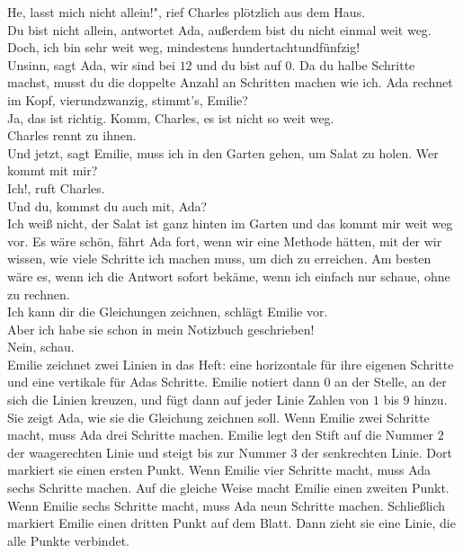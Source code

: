 \frqq{}He, lasst mich nicht allein!", rief Charles plötzlich aus dem Haus.\flqq{}\\
\frqq{}Du bist nicht allein\flqq{}, antwortet Ada, \frqq{} außerdem bist du nicht einmal weit weg.\flqq{}\\
\frqq{}Doch, ich bin sehr weit weg, mindestens hundertachtundfünfzig!\flqq{}\\
\frqq{}Unsinn\flqq{}, sagt Ada, \frqq{}wir sind bei $12$ und du bist auf $0$. Da du halbe Schritte machst, musst du die doppelte Anzahl an Schritten machen wie ich. Ada rechnet im Kopf, vierundzwanzig, stimmt's, Emilie?\flqq{}\\
\frqq{}Ja, das ist richtig. Komm, Charles, es ist nicht so weit weg.\flqq{}\\
Charles rennt zu ihnen.\\ 
\frqq{}Und jetzt\flqq{}, sagt Emilie, \frqq{}muss ich in den Garten gehen, um Salat zu holen. Wer kommt mit mir?\flqq{}\\
\frqq{}Ich!\flqq{}, ruft Charles.\\
\frqq{}Und du, kommst du auch mit, Ada?\flqq{}\\
\frqq{}Ich weiß nicht, der Salat ist ganz hinten im Garten und das kommt mir weit weg vor. Es wäre schön\flqq{}, fährt Ada fort, \frqq{}wenn wir eine Methode hätten, mit der wir wissen, wie viele Schritte ich machen muss, um dich zu erreichen. Am besten wäre es, wenn ich die Antwort sofort bekäme, wenn ich einfach nur schaue, ohne zu rechnen.\flqq{}\\
\frqq{}Ich kann dir die Gleichungen zeichnen\flqq{}, schlägt Emilie vor.\\
\frqq{}Aber ich habe sie schon in mein Notizbuch geschrieben!\flqq{}\\
\frqq{}Nein, schau.\flqq{}\\
Emilie zeichnet zwei Linien in das Heft: eine horizontale für ihre eigenen Schritte und eine vertikale für Adas Schritte. Emilie notiert dann $0$ an der Stelle, an der sich die Linien kreuzen, und fügt dann auf jeder Linie Zahlen von $1$ bis $9$ hinzu. Sie zeigt Ada, wie sie die Gleichung zeichnen soll. Wenn Emilie zwei Schritte macht, muss Ada drei Schritte machen. Emilie legt den Stift auf die Nummer $2$ der waagerechten Linie und steigt bis zur Nummer $3$ der senkrechten Linie. Dort markiert sie einen ersten Punkt. Wenn Emilie vier Schritte macht, muss Ada sechs Schritte machen. Auf die gleiche Weise macht Emilie einen zweiten Punkt. Wenn Emilie sechs Schritte macht, muss Ada neun Schritte machen. Schließlich markiert Emilie einen dritten Punkt auf dem Blatt. Dann zieht sie eine Linie, die alle Punkte verbindet.\\
